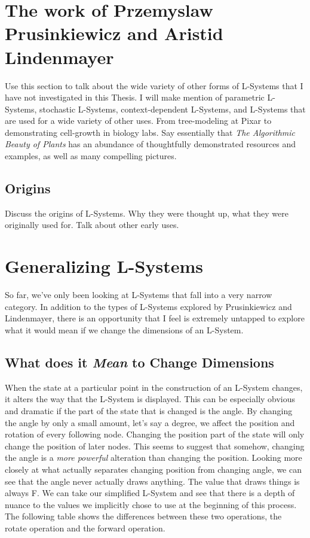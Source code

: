 \documentclass[12pt,twoside]{reedthesis}
\begin{document}
\section{The work of Przemyslaw Prusinkiewicz and Aristid Lindenmayer}

Use this section to talk about the wide variety of other forms of L-Systems that I have not investigated in this Thesis. I will make mention of parametric L-Systems, stochastic L-Systems, context-dependent L-Systems, and L-Systems that are used for a wide variety of other uses. From tree-modeling at Pixar to demonstrating cell-growth in biology labs.
Say essentially that \textit{The Algorithmic Beauty of Plants} has an abundance of thoughtfully demonstrated resources and examples, as well as many compelling pictures.

\subsection{Origins}
Discuss the origins of L-Systems. Why they were thought up, what they were originally used for. Talk about other early uses.

\section{Generalizing L-Systems}
So far, we've only been looking at L-Systems that fall into a very narrow category. In addition to the types of L-Systems explored by Prusinkiewicz and Lindenmayer, there is an opportunity that I feel is extremely untapped to explore what it would mean if we change the dimensions of an L-System. 

\subsection{What does it \textit{Mean} to Change Dimensions}
When the state at a particular point in the construction of an L-System changes, it alters the way that the L-System is displayed. This can be especially obvious and dramatic if the part of the state that is changed is the angle. By changing the angle by only a small amount, let's say a degree, we affect the position and rotation of every following node. Changing the position part of the state will only change the position of later nodes. This seems to suggest that somehow, changing the angle is a \textit{more powerful} alteration than changing the position. Looking more closely at what actually separates changing position from changing angle, we can see that the angle never actually draws anything. The value that draws things is always F. We can take our simplified L-System and see that there is a depth of nuance to the values we implicitly chose to use at the beginning of this process. The following table shows the differences between these two operations, the rotate operation and the forward operation.
\end{document}
